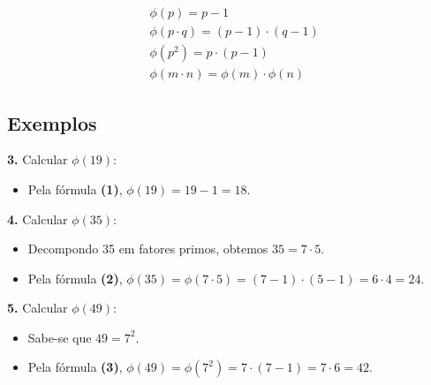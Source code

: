 \setcounter{equation}{0}
\begin{align}
     & \phi(p) = p-1                           \\
     & \phi(p \cdot q) = (p-1)\cdot(q-1)       \\
     & \phi(p^{2}) = p \cdot (p-1)             \\
     & \phi(m \cdot n) = \phi(m) \cdot \phi(n)
\end{align}

\subsection*{Exemplos}
\textbf{3.} Calcular $\phi(19)$:

\begin{itemize}
    \item Pela fórmula \textbf{(1)}, $\phi(19) = 19 - 1 = 18$.
\end{itemize}
\vspace{12pt}
\textbf{4.} Calcular $\phi(35)$:

\begin{itemize}
    \item Decompondo 35 em fatores primos, obtemos $35 = 7 \cdot 5$.
    \item Pela fórmula \textbf{(2)}, $\phi(35) = \phi(7 \cdot 5) = (7 - 1) \cdot (5 - 1) = 6 \cdot 4 = 24$.
\end{itemize}
\vspace{12pt}
\textbf{5.} Calcular $\phi(49)$:

\begin{itemize}
    \item Sabe-se que $49 = 7^{2}$.
    \item Pela fórmula \textbf{(3)}, $\phi(49) = \phi(7^{2}) = 7 \cdot (7 - 1) = 7 \cdot 6 = 42$.
\end{itemize}
